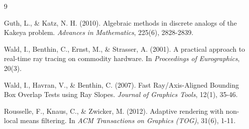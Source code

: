 \documentclass[11pt,a4paper]{article}
\begin{document}

\begin{thebibliography}{9}

Guth, L., \& Katz, N. H. (2010).
\newblock Algebraic methods in discrete analogs of the Kakeya problem.
\newblock \emph{Advances in Mathematics}, 225(6), 2828-2839.

Wald, I., Benthin, C., Ernst, M., \& Strasser, A. (2001).
\newblock A practical approach to real-time ray tracing on commodity hardware.
\newblock In \emph{Proceedings of Eurographics}, 20(3).

Wald, I., Havran, V., \& Benthin, C. (2007).
\newblock Fast Ray/Axis-Aligned Bounding Box Overlap Tests using Ray Slopes.
\newblock \emph{Journal of Graphics Tools}, 12(1), 35-46.

Rousselle, F., Knaus, C., \& Zwicker, M. (2012).
\newblock Adaptive rendering with non-local means filtering.
\newblock In \emph{ACM Transactions on Graphics (TOG)}, 31(6), 1-11.

\end{thebibliography}
\end{document}
